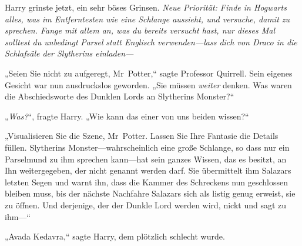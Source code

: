 Harry grinste jetzt, ein sehr böses Grinsen. \emph{Neue Priorität: Finde in Hogwarts alles, was im Entferntesten wie eine Schlange aussieht, und versuche, damit zu sprechen. Fange mit allem an, was du bereits versucht hast, nur dieses Mal solltest du unbedingt} \emph{Parsel} \emph{statt Englisch verwenden—lass dich von Draco in die Schlafsäle der Slytherins einladen—}

„Seien Sie nicht zu aufgeregt, Mr~Potter,“ sagte Professor Quirrell. Sein eigenes Gesicht war nun ausdruckslos geworden. „Sie müssen \emph{weiter} denken. Was waren die Abschiedsworte des Dunklen Lords an Slytherins Monster?“

„\emph{Was?}“, fragte Harry. „Wie kann das einer von uns beiden wissen?“

„Visualisieren Sie die Szene, Mr~Potter. Lassen Sie Ihre Fantasie die Details füllen. Slytherins Monster—wahrscheinlich eine große Schlange, so dass nur ein Parselmund zu ihm sprechen kann—hat sein ganzes Wissen, das es besitzt, an Ihn weitergegeben, der nicht genannt werden darf. Sie übermittelt ihm Salazars letzten Segen und warnt ihn, dass die Kammer des Schreckens nun geschlossen bleiben muss, bis der nächste Nachfahre Salazars sich als listig genug erweist, sie zu öffnen. Und derjenige, der der Dunkle Lord werden wird, nickt und sagt zu ihm—“

„Avada Kedavra,“ sagte Harry, dem plötzlich schlecht wurde.

